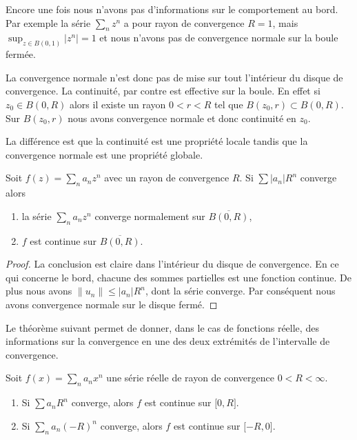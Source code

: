 \begin{example}
    Encore une fois nous n'avons pas d'informations sur le comportement au bord. Par exemple la série \( \sum_nz^n\) a pour rayon de convergence \( R=1\), mais \( \sup_{z\in B(0,1)}| z^n |=1\) et nous n'avons pas de convergence normale sur la boule fermée.
\end{example}

La convergence normale n'est donc pas de mise sur tout l'intérieur du disque de convergence. La continuité, par contre est effective sur la boule. En effet si \( z_0\in B(0,R)\) alors il existe un rayon \( 0<r<R\) tel que \( B(z_0,r)\subset B(0,R)\). Sur \( B(z_0,r)\) nous avons convergence normale et donc continuité en \( z_0\).

La différence est que la continuité est une propriété locale tandis que la convergence normale est une propriété globale.

\begin{proposition}
    Soit \( f(z)=\sum_na_nz^n\) avec un rayon de convergence \( R\). Si \( \sum | a_n |R^n\) converge alors
    \begin{enumerate}
        \item
            la série \( \sum_na_nz^n\) converge normalement sur \( \overline{ B(0,R) }\),
        \item
            \( f\) est continue sur \( \overline{ B(0,R) }\).
    \end{enumerate}
\end{proposition}

\begin{proof}
    La conclusion est claire dans l'intérieur du disque de convergence. En ce qui concerne le bord, chacune des sommes partielles est une fonction continue. De plus nous avons \( \| u_n \|\leq | a_n |R^n\), dont la série converge. Par conséquent nous avons convergence normale sur le disque fermé.
\end{proof}

Le théorème suivant permet de donner, dans le cas de fonctions réelle, des informations sur la convergence en une des deux extrémités de l'intervalle de convergence.
\begin{theorem} \label{ThoLUXVjs}
    Soit \( f(x)=\sum_na_nx^n\) une série réelle de rayon de convergence \( 0<R<\infty\).
    \begin{enumerate}
        \item
            Si \( \sum a_nR^n\) converge, alors \( f\) est continue sur \( \mathopen[ 0 , R \mathclose]\).
        \item
            Si \( \sum_na_n(-R)^n\) converge, alors \( f\) est continue sur \( \mathopen[ -R , 0 \mathclose]\).
    \end{enumerate}
\end{theorem}

